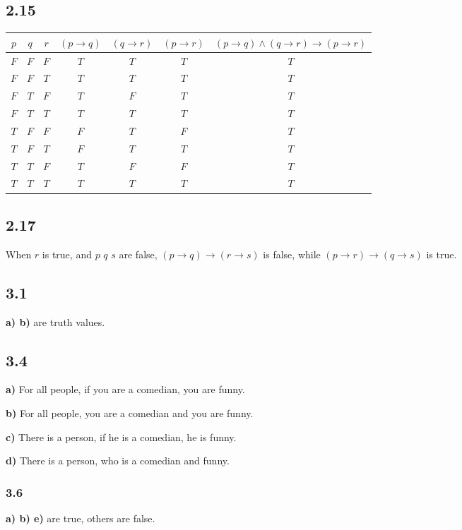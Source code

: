 \documentclass[10pt]{ctexart}
\begin{document}
    \newpage
    \subsection*{2.15}    
    \begin{table}[h]
        \centering
        \begin{tabular}{|c|c|c|c|c|c|c|}
            \hline
            $p$ & $q$ & $r$ & $(p \rightarrow q)$ & $(q \rightarrow r)$ & $(p \rightarrow r)$ & $(p \rightarrow q) \wedge (q \rightarrow r) \rightarrow (p \rightarrow r)$ \\
            \hline
            $F$ & $F$ & $F$ & $T$ & $T$ & $T$ & $T$ \\
            \hline
            $F$ & $F$ & $T$ & $T$ & $T$ & $T$ & $T$ \\
            \hline
            $F$ & $T$ & $F$ & $T$ & $F$ & $T$ & $T$ \\
            \hline
            $F$ & $T$ & $T$ & $T$ & $T$ & $T$ & $T$ \\
            \hline
            $T$ & $F$ & $F$ & $F$ & $T$ & $F$ & $T$ \\
            \hline
            $T$ & $F$ & $T$ & $F$ & $T$ & $T$ & $T$ \\
            \hline
            $T$ & $T$ & $F$ & $T$ & $F$ & $F$ & $T$ \\
            \hline
            $T$ & $T$ & $T$ & $T$ & $T$ & $T$ & $T$ \\
            \hline
        \end{tabular}
    \end{table}

    \subsection*{2.17}
    When $r$ is true, and $p$ $q$ $s$ are false, $(p \rightarrow q) \rightarrow (r \rightarrow s)$ is false, while $(p \rightarrow r) \rightarrow (q \rightarrow s)$ is true.

    \subsection*{3.1}
    \textbf{a) b)} are truth values.

    \subsection*{3.4}
        \textbf{a)} For all people, if you are a comedian, you are funny. \par
        \textbf{b)} For all people, you are a comedian and you are funny. \par
        \textbf{c)} There is a person, if he is a comedian, he is funny. \par
        \textbf{d)} There is a person, who is a comedian and funny.
    
    \subsubsection*{3.6}
    \textbf{a) b) e)} are true, others are false.
\end{document}
